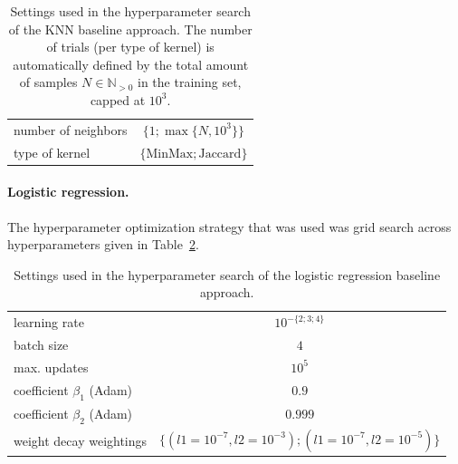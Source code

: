 \documentclass[oneside]{book}
\begin{document}
\begin{table}[htp]%
    \begin{center}%
        \begin{tabular}{lc}%
            \toprule
            number of neighbors & $\{1; \max\{N, 10^{3}\}\}$ \\
            type of kernel & $\{\mathrm{MinMax}; \mathrm{Jaccard}\}$ \\
            \bottomrule
        \end{tabular}%
        \caption[Hyperparameter search of the KNN baseline]{Settings used in the hyperparameter search of the KNN baseline approach. 
        The number of trials (per type of kernel) is automatically defined by the total 
        amount of samples $N\in\mathbb{N}_{> 0}$ in the training set, capped at $10^{3}$.}%
        \label{tab:knn_settings}%
    \end{center}%
\end{table}

\paragraph{Logistic regression.}
The hyperparameter optimization strategy that was used was grid search
across hyperparameters given in Table~\ref{tab:logistic_regression_settings}.

\begin{table}[htp]%
    \begin{center}%
        \begin{tabular}{lc}%
            \toprule
            learning rate & $10^{-\{2; 3; 4\}}$ \\
            batch size & $4$ \\
            max. updates & $10^{5}$ \\
            coefficient $\beta_{1}$ (Adam) & $0.9$ \\
            coefficient $\beta_{2}$ (Adam) & $0.999$ \\
            weight decay weightings & $\{(l1=10^{-7}, l2=10^{-3});(l1=10^{-7}, l2=10^{-5})\}$ \\
            \bottomrule
        \end{tabular}%
        \caption[Hyperparameter search of the logistic regression]{Settings used in the hyperparameter search of the logistic regression baseline approach.}%
        \label{tab:logistic_regression_settings}%
    \end{center}%
\end{table}
\end{document}
